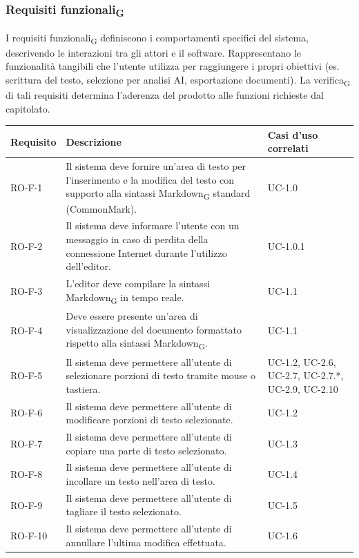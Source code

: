 \documentclass[11pt,a4paper]{article}
\newcommand{\gls}[1]{#1\textsubscript{G}}
\begin{document}
\subsubsection{\gls{Requisiti funzionali}}
I \gls{requisiti funzionali} definiscono i comportamenti specifici del sistema, descrivendo le interazioni tra gli attori e il software.
Rappresentano le funzionalità tangibili che l'utente utilizza per raggiungere i propri obiettivi (es. scrittura del testo, selezione per analisi AI, esportazione documenti). La \gls{verifica} di tali requisiti determina l'aderenza del prodotto alle funzioni richieste dal capitolato.

\begin{longtable}{|p{}|>{\raggedright\arraybackslash}p{}|p{}|}
\hline
\textbf{Requisito} & \textbf{Descrizione} & \textbf{Casi d'uso correlati}\\
\hline
\endhead
RO-F-1 & Il sistema deve fornire un'area di testo per l'inserimento e la modifica del testo con supporto alla sintassi \gls{Markdown} standard (CommonMark). & UC-1.0 \\
\hline
RO-F-2 & Il sistema deve informare l'utente con un messaggio in caso di perdita della connessione Internet durante l'utilizzo dell'editor. & UC-1.0.1 \\
\hline
RO-F-3 & L'editor deve compilare la sintassi \gls{Markdown} in tempo reale. & UC-1.1 \\
\hline
RO-F-4 & Deve essere presente un'area di visualizzazione del documento formattato rispetto alla sintassi \gls{Markdown}. & UC-1.1 \\
\hline
RO-F-5 & Il sistema deve permettere all'utente di selezionare porzioni di testo tramite mouse o tastiera. & UC-1.2, UC-2.6, UC-2.7, UC-2.7.*, UC-2.9, UC-2.10 \\
\hline
RO-F-6 & Il sistema deve permettere all'utente di modificare porzioni di testo selezionate. & UC-1.2 \\
\hline
RO-F-7 & Il sistema deve permettere all'utente di copiare una parte di testo selezionato. & UC-1.3 \\
\hline
RO-F-8 & Il sistema deve permettere all'utente di incollare un testo nell'area di testo. & UC-1.4 \\
\hline
RO-F-9 & Il sistema deve permettere all'utente di tagliare il testo selezionato. & UC-1.5 \\
\hline
RO-F-10 & Il sistema deve permettere all'utente di annullare l'ultima modifica effettuata. & UC-1.6 \\

\end{longtable}
\end{document}
